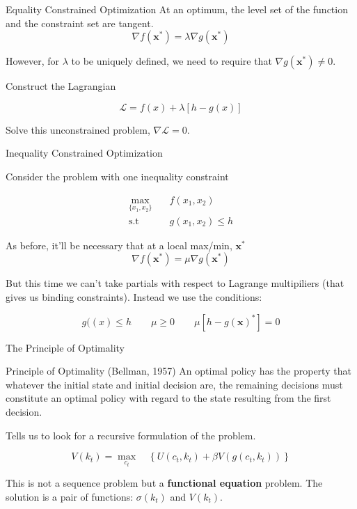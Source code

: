 \documentclass[11pt, xcolor={dvipsnames}, hyperref={colorlinks, allcolors=Blue}]{beamer}
\newcommand\bc[1]{{\usebeamercolor[fg]{frametitle} {\textbf{#1}}}} %
\newcommand{\x}{\mathbf{x}}
\begin{document}
\begin{frame}{Equality Constrained Optimization}
At an optimum, the level set of the function and the constraint set are tangent. \\

\[\nabla f(\x^{*}) = \lambda \nabla g(\x^{*})\]
\smallskip

However, for $\lambda$ to be uniquely defined, we need to require that $\nabla g(\x^{*}) \not = 0$.

Construct the Lagrangian

\[\mathcal{L} = f(x) + \lambda [h - g(x)]\]

Solve this unconstrained problem, $\nabla \mathcal{L} = 0$.

\end{frame}

\begin{frame}{Inequality Constrained Optimization}

Consider the problem with one inequality constraint 

\begin{align*}
\underset{\{x_{1}, x_{2}\}}{\mathrm{max}}  \quad& f(x_{1}, x_{2})\\
\text{s.t}\quad \ \ & g(x_{1}, x_{2}) \leq h
\end{align*}

As before, it'll be necessary that at a local max/min, $\x^{*}$
\[\nabla f(\x^{*}) = \mu \nabla g(\x^{*})\]\bigskip

But this time we can't take partials with respect to Lagrange multipiliers (that gives us binding constraints). Instead we use the conditions:

\[g((x) \leq h \qquad \mu\geq 0 \qquad \mu [h-g(\x)^{*}] = 0\]

\end{frame}

\begin{frame}{The Principle of Optimality}

\begin{block}{Principle of Optimality (Bellman, 1957)}
An optimal policy has the property that whatever the initial state and initial decision are, the remaining decisions must constitute an optimal policy with regard to the state resulting from the first decision.
\end{block}
\bigskip

Tells us to look for a recursive formulation of the problem.\bigskip

\[V(k_{t}) = \underset{c_{t}}{\max} \quad \left\{U(c_{t}, k_{t}) + \beta V(g(c_{t}, k_{t})) \right\}\]
\bigskip

This is not a sequence problem but a \bc{functional equation} problem. The solution is a pair of functions: $\sigma(k_{t})$ and $V(k_{t})$.

 \vfill\vfill
\end{frame}
\end{document}
